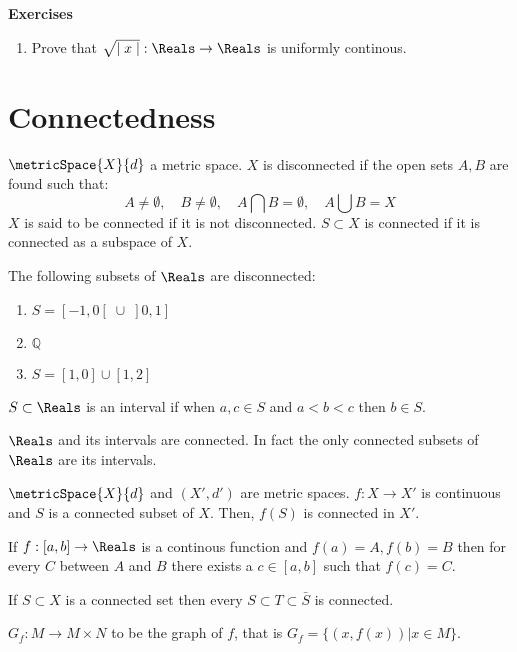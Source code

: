 {\Large\textbf{Exercises}}
\begin{enumerate}
    \item Prove that \(\sqrt{\mid x \mid} :\Reals \to \Reals\) is uniformly continous.
\end{enumerate}
\newpage

\section{Connectedness}
\begin{definition}
    \(\metricSpace{X}{d}\) a metric space. \(X\) is disconnected if the open sets \(A, B\) are found such that:
    \[A \neq \emptyset, \quad B \neq \emptyset, \quad A \bigcap B = \emptyset, \quad A \bigcup B = X\]
    \(X\) is said to be connected if it is not disconnected.
    \( S \subset X\) is connected if it is connected as a subspace of \(X\).
\end{definition}
\begin{example}
    The following subsets of \(\Reals\) are disconnected:
    \begin{enumerate}
        \item \(S = [-1,0[ \;\cup\; ]0,1]\)
        \item \(\mathbb{Q}\)
        \item \(S = [1,0] \cup [1,2]\)
    \end{enumerate}
\end{example}
\begin{definition}
    \(S \subset \Reals\) is an interval if when \(a , c \in S\) and \(a < b < c\) then \(b \in S\).
\end{definition}
\begin{example}
    \(\Reals\) and its intervals are connected. In fact the only connected subsets of \(\Reals\) are its intervals.
\end{example}
\begin{theorem}
    \(\metricSpace{X}{d}\) and \((X',d')\) are metric spaces. \(f : X \to X'\) is continuous and \(S\) is a connected subset of \(X\). Then, \(f(S)\) is connected in \(X'\).
\end{theorem}
\begin{corollary} 
    If \(f : [a,b] \to \Reals\) is a continous function and \(f(a) = A, f(b) = B\) then for every \(C\) between \(A\) and \(B\) there exists a \(c \in [a,b]\) such that \(f(c) = C\).
\end{corollary}
\begin{proposition}
    If \(S \subset X\) is a connected set then every \(S \subset T \subset \bar{S}\) is connected.
\end{proposition}
\begin{definition}
    \(G_f : M \to M \times N\) to be the graph of \(f\), that is \(G_f = \{(x,f(x)) | x \in M\}\).
\end{definition}

